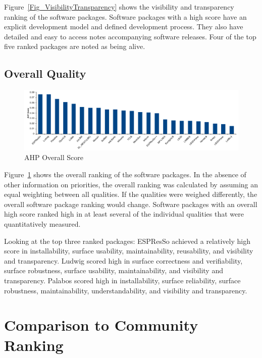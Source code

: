 \documentclass[final, 3p, times, authoryear]{elsarticle}
\begin{document}
Figure~\ref{Fig_VisibilityTransparency} shows the visibility and transparency
ranking of the software packages. Software packages with a high score have an
explicit development model and defined development process. They also have
detailed and easy to access notes accompanying software releases. Four of the
top five ranked packages are noted as being alive.

\subsection{Overall Quality} \label{Sec_OverallQuality}

\begin{figure}[h!]
	\centering
		\includegraphics[width=1.0\textwidth]{./figures/finalscore_chart.pdf}
		\caption{AHP Overall Score}
		\label{Fig_OverallScore}
\end{figure}

Figure~\ref{Fig_OverallScore} shows the overall ranking of the software
packages. In the absence of other information on priorities, the overall ranking
was calculated by assuming an equal weighting between all qualities. If the
qualities were weighed differently, the overall software package ranking would
change. Software packages with an overall high score ranked high in at least
several of the individual qualities that were quantitatively measured. 

Looking at the top three ranked packages: ESPResSo achieved a relatively high
score in installability, surface usability, maintainability, reusability, and
visibility and transparency. Ludwig scored high in surface correctness and
verifiability, surface robustness, surface usability, maintainability, and
visibility and transparency. Palabos scored high in installability, surface
reliability, surface robustness, maintainability, understandability, and
visibility and transparency.

\section{Comparison to Community Ranking} \label{repmetrics}
\end{document}
